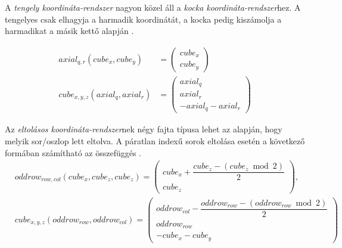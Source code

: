 
A \textit{tengely koordináta-rendszer} nagyon közel áll a \textit{kocka koordináta-rendszer}hez. A tengelyes csak elhagyja a harmadik koordinátát, a kocka pedig kiszámolja a harmadikat a másik kettő alapján \cite{Conv_Axial}.


\begin{align*}
axial_{q, r}(cube_{x}, cube_{y}) &=
\left(
\begin{array}{c}
cube_{x} \\
cube_{y}
\end{array}
\right)
\\
cube_{x,y,z} (axial_{q}, axial_{r}) &=
\left(
\begin{array}{c}
axial_q \\
axial_r \\
-axial_q - axial_r
\end{array}
\right)
\end{align*}


Az \textit{eltolásos koordináta-rendszer}nek négy fajta típusa lehet az alapján, hogy melyik sor/oszlop lett eltolva. A páratlan indexű sorok eltolása esetén a következő formában számítható az összefüggés \cite{Conv_Offset}.
\begin{align*}
&oddrow_{row, col}(cube_{x},cube_{z}, cube_{z}) =
\left(
\begin{array}{c}
cube_{x} + \dfrac{cube_{z} - (cube_{z} \bmod 2)}{2} \\
cube_{z}
\end{array}
\right),
\\
&cube_{x, y, z}(oddrow_{row}, oddrow_{col}) =
\left(
\begin{array}{c}
oddrow_{col} - \dfrac{oddrow_{row} - (oddrow_{row} \bmod 2)}{2} \\
oddrow_{row} \\
-cube_{x} - cube_{y}
\end{array}
\right)
\end{align*}

